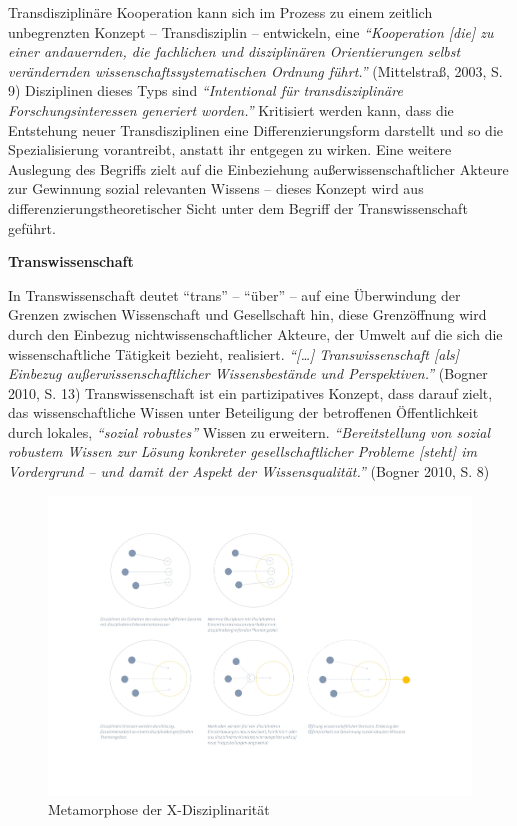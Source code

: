 \documentclass[a4paper,
fontsize=11pt,
oneside,
numbers=noperiodatend,
parskip=half-,
bibliography=totoc,
final
]{scrartcl}
\begin{document}
Transdisziplinäre Kooperation kann sich im Prozess zu einem zeitlich
unbegrenzten Konzept -- Transdisziplin -- entwickeln, eine
\emph{\enquote{Kooperation {[}die{]} zu einer andauernden, die
fachlichen und disziplinären Orientierungen selbst verändernden
wissenschaftssystematischen Ordnung führt.}} (Mittelstraß, 2003, S. 9)
Disziplinen dieses Typs sind \emph{\enquote{Intentional für
transdisziplinäre Forschungsinteressen generiert worden.}} Kritisiert
werden kann, dass die Entstehung neuer Transdisziplinen eine
Differenzierungsform darstellt und so die Spezialisierung vorantreibt,
anstatt ihr entgegen zu wirken. Eine weitere Auslegung des Begriffs
zielt auf die Einbeziehung außerwissenschaftlicher Akteure zur Gewinnung
sozial relevanten Wissens -- dieses Konzept wird aus
differenzierungstheoretischer Sicht unter dem Begriff der
Transwissenschaft geführt.

\textbf{Transwissenschaft}

In Transwissenschaft deutet \enquote{trans} -- \enquote{über} -- auf
eine Überwindung der Grenzen zwischen Wissenschaft und Gesellschaft hin,
diese Grenzöffnung wird durch den Einbezug nichtwissenschaftlicher
Akteure, der Umwelt auf die sich die wissenschaftliche Tätigkeit
bezieht, realisiert. \emph{\enquote{{[}\ldots{}{]}\emph{
}Transwissenschaft {[}als{]} Einbezug außerwissenschaftlicher
Wissensbestände und Perspektiven.}} (Bogner 2010, S. 13)
Transwissenschaft ist ein partizipatives Konzept, dass darauf zielt, das
wissenschaftliche Wissen unter Beteiligung der betroffenen
Öffentlichkeit durch lokales, \emph{\enquote{sozial robustes}} Wissen zu
erweitern. \emph{\enquote{Bereitstellung von sozial robustem Wissen zur
Lösung konkreter gesellschaftlicher Probleme {[}steht{]} im Vordergrund
-- und damit der Aspekt der Wissensqualität.}} (Bogner 2010, S. 8)

\begin{figure}
\centering
\includegraphics{img/Metamorphose_X.jpg}
\caption{Metamorphose der X-Disziplinarität}
\end{figure}
\end{document}
